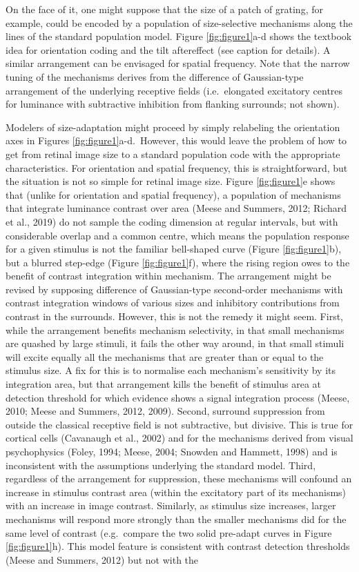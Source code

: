 \documentclass[
]{article}
\begin{document}
On the face of it, one might suppose that the size of a patch of grating, for example, could be encoded by a population of size-selective mechanisms along the lines of the standard population model. Figure \ref{fig:figure1}a-d shows the textbook idea for orientation coding and the tilt aftereffect (see caption for details). A similar arrangement can be envisaged for spatial frequency. Note that the narrow tuning of the mechanisms derives from the difference of Gaussian-type arrangement of the underlying receptive fields (i.e.~elongated excitatory centres for luminance with subtractive inhibition from flanking surrounds; not shown).

Modelers of size-adaptation might proceed by simply relabeling the orientation axes in Figures \ref{fig:figure1}a-d.~However, this would leave the problem of how to get from retinal image size to a standard population code with the appropriate characteristics. For orientation and spatial frequency, this is straightforward, but the situation is not so simple for retinal image size. Figure \ref{fig:figure1}e shows that (unlike for orientation and spatial frequency), a population of mechanisms that integrate luminance contrast over area (Meese and Summers, 2012; Richard et al., 2019) do not sample the coding dimension at regular intervals, but with considerable overlap and a common centre, which means the population response for a given stimulus is not the familiar bell-shaped curve (Figure \ref{fig:figure1}b), but a blurred step-edge (Figure \ref{fig:figure1}f), where the rising region owes to the benefit of contrast integration within mechanism. The arrangement might be revised by supposing difference of Gaussian-type second-order mechanisms with contrast integration windows of various sizes and inhibitory contributions from contrast in the surrounds. However, this is not the remedy it might seem. First, while the arrangement benefits mechanism selectivity, in that small mechanisms are quashed by large stimuli, it fails the other way around, in that small stimuli will excite equally all the mechanisms that are greater than or equal to the stimulus size. A fix for this is to normalise each mechanism's sensitivity by its integration area, but that arrangement kills the benefit of stimulus area at detection threshold for which evidence shows a signal integration process (Meese, 2010; Meese and Summers, 2012, 2009). Second, surround suppression from outside the classical receptive field is not subtractive, but divisive. This is true for cortical cells (Cavanaugh et al., 2002) and for the mechanisms derived from visual psychophysics (Foley, 1994; Meese, 2004; Snowden and Hammett, 1998) and is inconsistent with the assumptions underlying the standard model. Third, regardless of the arrangement for suppression, these mechanisms will confound an increase in stimulus contrast area (within the excitatory part of its mechanisms) with an increase in image contrast. Similarly, as stimulus size increases, larger mechanisms will respond more strongly than the smaller mechanisms did for the same level of contrast (e.g.~compare the two solid pre-adapt curves in Figure \ref{fig:figure1}h). This model feature is consistent with contrast detection thresholds (Meese and Summers, 2012) but not with the 
\end{document}
